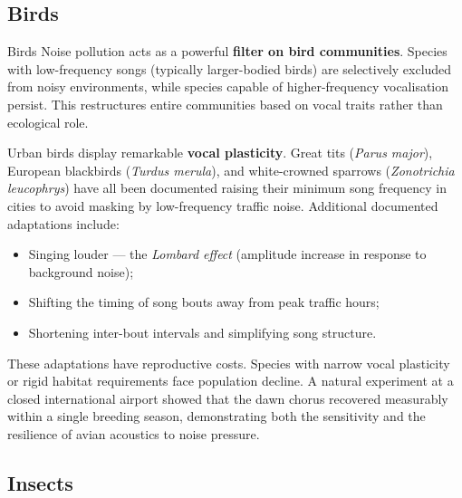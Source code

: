 \documentclass[12pt, a4paper]{article}
\begin{document}
\subsection{Birds}

\begin{speciesbox}{Birds}
Noise pollution acts as a powerful \textbf{filter on bird communities}. Species with
low-frequency songs (typically larger-bodied birds) are selectively excluded from noisy
environments, while species capable of higher-frequency vocalisation persist. This restructures
entire communities based on vocal traits rather than ecological role.

\medskip
Urban birds display remarkable \textbf{vocal plasticity}. Great tits (\textit{Parus major}),
European blackbirds (\textit{Turdus merula}), and white-crowned sparrows
(\textit{Zonotrichia leucophrys}) have all been documented raising their minimum song frequency
in cities to avoid masking by low-frequency traffic noise. Additional documented adaptations
include:

\begin{itemize}[itemsep=2pt]
  \item Singing louder --- the \textit{Lombard effect} (amplitude increase in response to
        background noise);
  \item Shifting the timing of song bouts away from peak traffic hours;
  \item Shortening inter-bout intervals and simplifying song structure.
\end{itemize}

\medskip
These adaptations have reproductive costs. Species with narrow vocal plasticity or rigid
habitat requirements face population decline. A natural experiment at a closed international
airport showed that the dawn chorus recovered measurably within a single breeding season,
demonstrating both the sensitivity and the resilience of avian acoustics to noise pressure.
\end{speciesbox}

\subsection{Insects}
\end{document}
